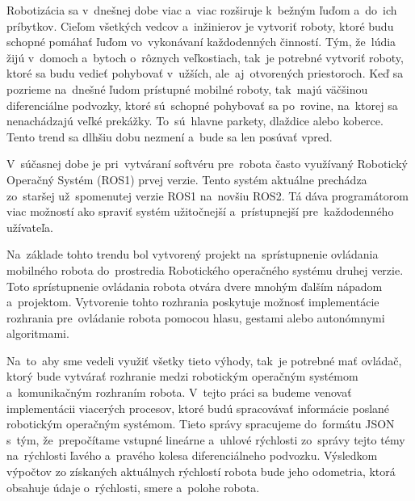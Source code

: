 
Robotizácia sa v~dnešnej dobe viac a~viac rozširuje k~bežným ľuďom a~do~ich príbytkov. Cieľom všetkých vedcov
a~inžinierov je vytvoriť roboty, ktoré budu schopné pomáhať ľuďom vo~vykonávaní každodenných činností. Tým,
že~lúdia žijú v~domoch a~bytoch o~rôznych veľkostiach, tak~je potrebné vytvoriť roboty, ktoré sa budu vedieť
pohybovať v~užších, ale~aj~otvorených priestoroch. Keď sa pozrieme na~dnešné ľudom prístupné mobilné roboty,
tak~majú väčšinou diferenciálne podvozky, ktoré sú~schopné pohybovať sa po~rovine, na~ktorej sa nenachádzajú veľké
prekážky. To~sú~hlavne parkety, dlaždice alebo koberce. Tento trend sa dlhšiu dobu nezmení a~bude sa len posúvať
vpred.

V~súčasnej dobe je pri~vytváraní softvéru pre~robota často využívaný Robotický Operačný Systém (ROS1) prvej verzie.
Tento systém aktuálne prechádza zo~staršej už~spomenutej verzie ROS1 na~novšiu ROS2. Tá dáva programátorom viac
možností ako spraviť systém užitočnejší a~prístupnejší pre~každodenného užívateľa.

Na~základe tohto trendu bol vytvorený projekt na~sprístupnenie ovládania mobilného robota do~prostredia Robotického
operačného systému druhej verzie. Toto sprístupnenie ovládania robota otvára dvere mnohým ďalším nápadom a~projektom.
Vytvorenie tohto rozhrania poskytuje možnosť implementácie rozhrania pre~ovládanie robota pomocou hlasu, gestami alebo
autonómnymi algoritmami.

Na~to~aby sme vedeli využiť všetky tieto výhody, tak~je potrebné mať ovládač, ktorý bude vytvárať rozhranie medzi
robotickým operačným systémom a~komunikačným rozhraním robota. V~tejto práci sa budeme venovať implementácii viacerých
procesov, ktoré budú spracovávať informácie poslané robotickým operačným systémom. Tieto správy spracujeme
do~formátu JSON s~tým, že~prepočítame vstupné lineárne a~uhlové rýchlosti zo~správy tejto témy na~rýchlosti ľavého
a~pravého kolesa diferenciálneho podvozku. Výsledkom výpočtov zo získaných aktuálnych rýchlostí robota bude jeho
odometria, ktorá obsahuje údaje o~rýchlosti, smere a~polohe robota.
